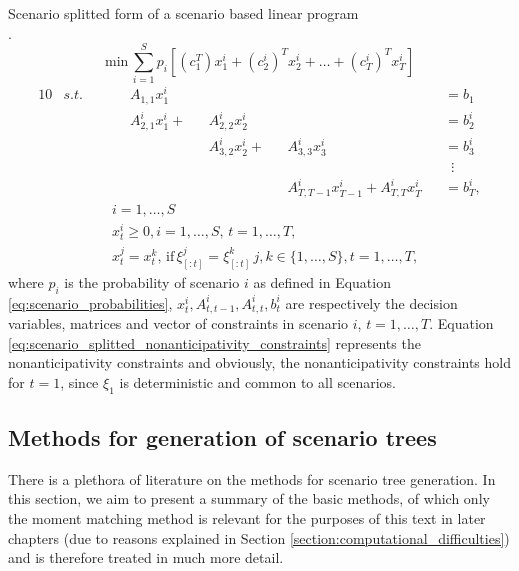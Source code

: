 \begin{defn}
\label{eq:scenario_splitted_linear_programming_formulation}
{Scenario splitted form of a scenario based linear program \\ \cite{defourny_scenario_trees_scenario_splitted_formulation}}.
\footnotesize
\begin{equation*}
\mathrm{min} \, \sum_{i=1}^S p_i \left[ (c_1^T)x_1^i + (c_2^i)^Tx_2^i + \dots + (c_T^i)^Tx_T^i  \right]
\end{equation*}
\vspace{-0.5cm}
\begin{alignat}{10}
& s.t. && \, && A_{1,1}x_1^i && && \,&&=b_1 \nonumber \\
& && && A_{2,1}^ix_1^i  + &&A_{2,2}^ix_2^i && &&=b_2^i \nonumber \\
& && && && A_{3,2}^ix_{2}^i  + && A_{3,3}^ix_{3}^i &&=b_3^i \nonumber \\
& && && && && &&  \, \, \, \vdots \nonumber \\
& && && && && A_{T,T-1}^ix_{T-1}^i  +  A_{T,T}^ix_{T}^i &&=b_{T}^i, \nonumber
\end{alignat}
\vspace{-0.5cm}
\begin{align}
\label{eq:scenario_splitted_nonanticipativity_constraints}
& i=1,\dots,S \nonumber \\
&  x_{t}^i \geq 0, i=1,\dots,S, \, t=1,\dots,T,  \nonumber \\
& x_t^j=x_t^k, \, \mathrm{if} \, \xi_{[:t]}^j=\xi_{[:t]}^k \, j,k \in \{1,\dots,S\} , t=1,\dots,T,
\end{align}
\normalsize
where $p_i$ is the probability of scenario $i$ as defined in Equation \ref{eq:scenario_probabilities}, $x_t^i, A_{t,t-1}^i, A_{t,t}^i, b_{t}^i$ are respectively the decision variables, matrices and vector of constraints in scenario $i$, $t=1,\dots,T$. Equation \ref{eq:scenario_splitted_nonanticipativity_constraints} represents the nonanticipativity constraints and obviously, the nonanticipativity constraints hold for $t=1$, since $\xi_1$ is deterministic and common to all scenarios.
\end{defn}
\subsection{Methods for generation of scenario trees}
There is a plethora of literature on the methods for scenario tree generation. In this section, we aim to present a summary of the basic methods, of which only the moment matching method is relevant for the purposes of this text in later chapters (due to reasons explained in Section \ref{section:computational_difficulties}) and is therefore treated in much more detail. 

